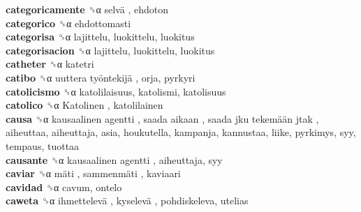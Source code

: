 \textbf{categoricamente} ␝α   selvä , ehdoton  \\
\textbf{categorico} ␝α  ehdottomasti  \\
\textbf{categorisa} ␝α  lajittelu, luokittelu, luokitus  \\
\textbf{categorisacion} ␝α  lajittelu, luokittelu, luokitus  \\
\textbf{catheter} ␝α  katetri  \\
\textbf{catibo} ␝α   uuttera työntekijä , orja, pyrkyri  \\
\textbf{catolicismo} ␝α  katolilaisuus, katolismi, katolisuus  \\
\textbf{catolico} ␝α   Katolinen , katolilainen  \\
\textbf{causa} ␝α   kausaalinen agentti ,  saada aikaan ,  saada jku tekemään jtak , aiheuttaa, aiheuttaja, asia, houkutella, kampanja, kannustaa, liike, pyrkimys, syy, tempaus, tuottaa  \\
\textbf{causante} ␝α   kausaalinen agentti , aiheuttaja, syy  \\
\textbf{caviar} ␝α   mäti ,  sammenmäti , kaviaari  \\
\textbf{cavidad} ␝α  cavum, ontelo  \\
\textbf{caweta} ␝α   ihmettelevä ,  kyselevä , pohdiskeleva, utelias  \\

